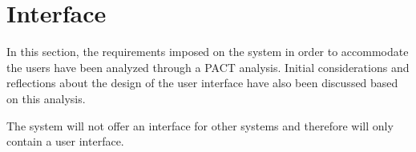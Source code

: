 \section{Interface}\label{sc:interface}
In this section, the requirements imposed on the system in order to accommodate the users have been analyzed through a PACT analysis. Initial considerations and reflections about the design of the user interface have also been discussed based on this analysis. 
\par
The system will not offer an interface for other systems and therefore will only contain a user interface.